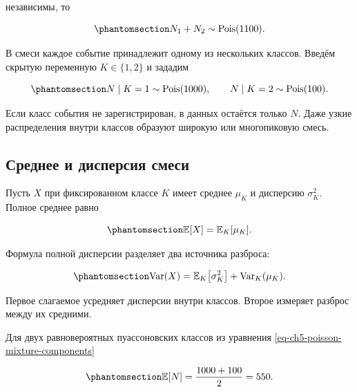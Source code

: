 \documentclass[
  russian,
  11pt,
  a4paper,
  open=any]{scrbook}
\begin{document}
независимы, то

\begin{equation}\protect\phantomsection\label{eq-ch5-poisson-sum}{
N_1+N_2\sim\operatorname{Pois}(1100).
}\end{equation}

В смеси каждое событие принадлежит одному из нескольких классов. Введём
скрытую переменную \(K\in\{1,2\}\) и зададим

\begin{equation}\protect\phantomsection\label{eq-ch5-poisson-mixture-components}{
N\mid K=1\sim\operatorname{Pois}(1000),
\qquad
N\mid K=2\sim\operatorname{Pois}(100).
}\end{equation}

Если класс события не зарегистрирован, в данных остаётся только \(N\).
Даже узкие распределения внутри классов образуют широкую или
многопиковую смесь.

\subsection{Среднее и дисперсия
смеси}\label{ux441ux440ux435ux434ux43dux435ux435-ux438-ux434ux438ux441ux43fux435ux440ux441ux438ux44f-ux441ux43cux435ux441ux438}

Пусть \(X\) при фиксированном классе \(K\) имеет среднее \(\mu_K\) и
дисперсию \(\sigma_K^2\). Полное среднее равно

\begin{equation}\protect\phantomsection\label{eq-ch5-mixture-mean}{
\mathbb E[X]=\mathbb E_K[\mu_K].
}\end{equation}

Формула полной дисперсии разделяет два источника разброса:

\begin{equation}\protect\phantomsection\label{eq-ch5-total-variance}{
\operatorname{Var}(X)
=\mathbb E_K\!\left[\sigma_K^2\right]
+\operatorname{Var}_K(\mu_K).
}\end{equation}

Первое слагаемое усредняет дисперсии внутри классов. Второе измеряет
разброс между их средними.

Для двух равновероятных пуассоновских классов из уравнения
\ref{eq-ch5-poisson-mixture-components}

\begin{equation}\protect\phantomsection\label{eq-ch5-poisson-mixture-mean}{
\mathbb E[N]=\frac{1000+100}{2}=550.
}\end{equation}
\end{document}
